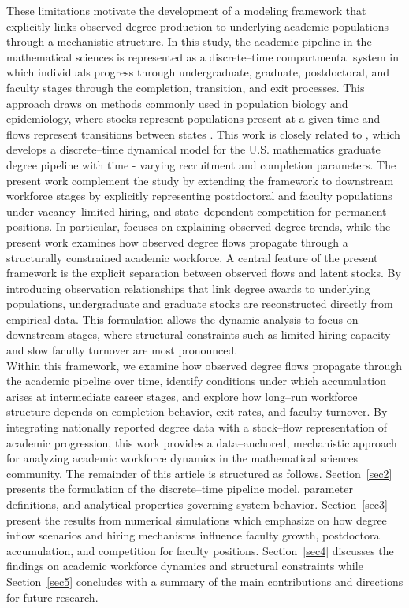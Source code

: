\documentclass[3p]{elsarticle}%
\theoremstyle{definition}
\begin{document}
 \noindent These limitations motivate the development of a modeling framework that explicitly links observed degree production to underlying academic populations through a mechanistic structure. In this study, the academic pipeline in the mathematical sciences is represented as a discrete--time compartmental system in which individuals progress through undergraduate, graduate, postdoctoral, and faculty stages through the completion, transition, and exit processes. This approach draws on methods commonly used in population biology and epidemiology, where stocks represent populations present at a given time and flows represent transitions between states \cite{b1,brauer2012mathematical,iyi5}. This work is closely related to \cite{topaz2026dynamicalmodelusmathematics}, which develops a discrete--time dynamical model for the U.S. mathematics graduate degree pipeline with time - varying recruitment and completion parameters. The present work complement the study by extending the framework to downstream workforce stages by explicitly representing postdoctoral and faculty populations under vacancy--limited hiring, and state--dependent competition for permanent positions. In particular, \cite{topaz2026dynamicalmodelusmathematics} focuses on explaining observed degree trends, while the present work examines how observed degree flows propagate through a structurally constrained academic workforce. A central feature of the present framework is the explicit separation between observed flows and latent stocks. By introducing observation relationships that link degree awards to underlying populations, undergraduate and graduate stocks are reconstructed directly from empirical data. This formulation allows the dynamic analysis to focus on downstream stages, where structural constraints such as limited hiring capacity and slow faculty turnover are most pronounced.\\ 
 
 \noindent Within this framework, we examine how observed degree flows propagate through the academic pipeline over time, identify conditions under which accumulation arises at intermediate career stages, and explore how long--run workforce structure depends on completion behavior, exit rates, and faculty turnover. By integrating nationally reported degree data with a stock–flow representation of academic progression, this work provides a data--anchored, mechanistic approach for analyzing academic workforce dynamics in the mathematical sciences community. The remainder of this article is structured as follows. Section~\ref{sec2} presents the formulation of the discrete--time pipeline model, parameter definitions, and analytical properties governing system behavior. Section~\ref{sec3} present the results from numerical simulations which emphasize on how degree inflow scenarios and hiring mechanisms influence faculty growth, postdoctoral accumulation, and competition for faculty positions. Section~\ref{sec4} discusses the findings on academic workforce dynamics and structural constraints while Section~\ref{sec5} concludes with a summary of the main contributions and directions for future research.
\end{document}
